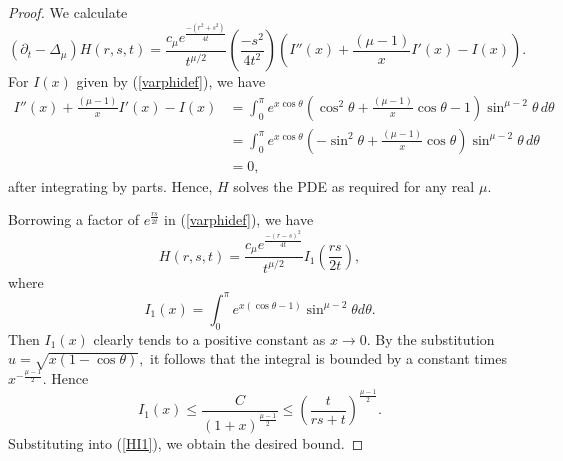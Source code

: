 \documentclass[10pt,a4paper]{amsart}
\newcommand{\p}{\partial}
\begin{document}
\begin{proof} %
We calculate
\begin{equation*}
\left( \p_t - \Delta_\mu \right) H(r,s,t) = \frac{c_\mu e^{\frac{-(r^2 + s^2)}{4t}}}{t^{\mu/2} } \left( \frac{-s^2}{4t^2} \right) \left( I''(x) + \frac{(\mu - 1)}{x} I'(x) - I(x) \right).
\end{equation*}
For $I(x)$ given by (\ref{varphidef}), we have
\begin{equation}\label{Iode}
\begin{split}
I''(x) + \frac{(\mu-1)}{x} I'(x) - I(x) & = \int_0^\pi e^{x \cos \theta} \left( \cos^2 \theta + \frac{(\mu-1)}{x}\cos\theta - 1 \right) \sin^{\mu - 2} \theta \, d\theta \\
& = \int_0^\pi e^{x \cos \theta} \left( -\sin^2 \theta + \frac{(\mu - 1)}{x}\cos\theta\right) \sin^{\mu - 2} \theta \, d\theta \\
& = 0,
\end{split}
\end{equation}
after integrating by parts.
Hence, $H$ solves the PDE as required for any real $\mu.$

Borrowing a factor of $e^{\frac{rs}{2t}}$ in (\ref{varphidef}), we have
\begin{equation}\label{HI1}
H(r,s,t) = \frac{c_\mu e^{\frac{-(r - s)^2}{4t}}}{t^{\mu/2} } I_1\left( \frac{rs}{2t} \right),
\end{equation}
where
\begin{equation*}%
I_1(x) = \int_0^\pi e^{x (\cos \theta - 1) } \sin^{\mu - 2} \theta d\theta.
\end{equation*}
Then $I_1(x)$ clearly tends to a positive constant as $x \to 0.$ By the substitution $u = \sqrt{x(1 - \cos \theta )},$ it follows that the integral is bounded by a constant times $x^{-\frac{\mu - 1}{2}}.$ Hence
$$I_1(x) \leq \frac{C}{(1 + x)^{\frac{\mu - 1}{2}}} \leq \left( \frac{t}{rs + t} \right)^{\frac{\mu - 1}{2}}.$$
Substituting into (\ref{HI1}), we obtain the desired bound.
\end{proof}
\end{document}
